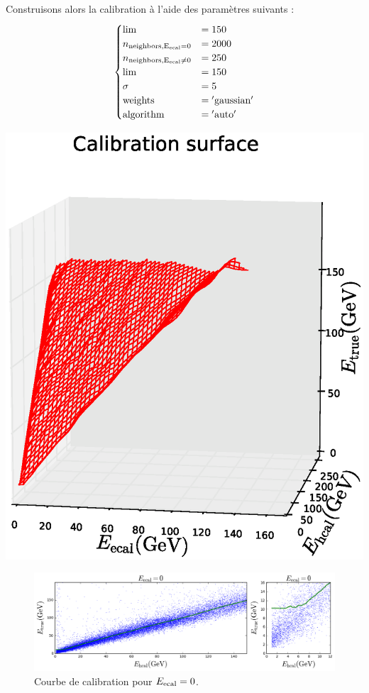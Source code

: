 \documentclass[11pt,a4paper]{article}
\begin{document}
\noindent
\begin{minipage}{0.6\linewidth}
Construisons alors la calibration  \cite{GitHubKNN} à l'aide des paramètres suivants : 
\[
\begin{cases}
\rm{lim} & = 150\\
n_{\rm neighbors, E_{\rm ecal} = 0} & = 2000\\
n_{\rm neighbors, E_{\rm ecal} \neq 0} & = 250\\
\rm{lim} & =150\\
\sigma  & = 5\\
\rm{weights} & = \rm{'gaussian'}\\
\rm{algorithm} & = \rm{'auto'}
\end{cases}
\]
\end{minipage}
\begin{minipage}{0.4\linewidth}
	\includegraphics[width=\textwidth]{images/pictures/testKNN/KNN_plot3D_surf.eps}
	\label{surfKNN}
\end{minipage}

\begin{figure}[!h]
\begin{center}
\includegraphics[width=\textwidth]{images/pictures/testKNN/KNN_calibration.png}
\caption{Courbe de calibration pour $E_{\rm ecal} = 0$.}
\end{center}
\end{figure}
\end{document}
